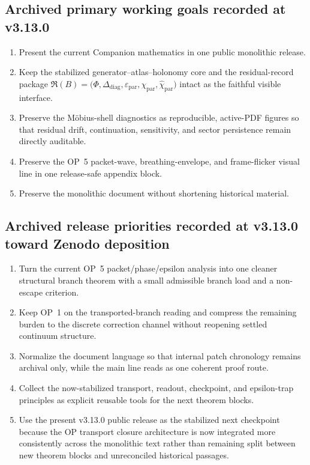 \subsection*{Archived primary working goals recorded at v3.13.0}
\begin{enumerate}[leftmargin=2em]
  \item Present the current Companion mathematics in one public monolithic release.
  \item Keep the stabilized generator--atlas--holonomy core and the residual-record package $\mathfrak R(B)=\bigl(\Phi,\Delta_{\mathrm{diag}},\varepsilon_{\mathrm{par}},\chi_{\mathrm{par}},\widehat\chi_{\mathrm{par}}\bigr)$ intact as the faithful visible interface.
  \item Preserve the M\"obius-shell diagnostics as reproducible, active-PDF figures so that residual drift, continuation, sensitivity, and sector persistence remain directly auditable.
  \item Preserve the OP~5 packet-wave, breathing-envelope, and frame-flicker visual line in one release-safe appendix block.
  \item Preserve the monolithic document without shortening historical material.
\end{enumerate}

\subsection*{Archived release priorities recorded at v3.13.0 toward Zenodo deposition}
\begin{enumerate}[leftmargin=2em]
  \item Turn the current OP~5 packet/phase/epsilon analysis into one cleaner structural branch theorem with a small admissible branch load and a non-escape criterion.
  \item Keep OP~1 on the transported-branch reading and compress the remaining burden to the discrete correction channel without reopening settled continuum structure.
  \item Normalize the document language so that internal patch chronology remains archival only, while the main line reads as one coherent proof route.
  \item Collect the now-stabilized transport, readout, checkpoint, and epsilon-trap principles as explicit reusable tools for the next theorem blocks.
  \item Use the present v3.13.0 public release as the stabilized next checkpoint because the OP transport closure architecture is now integrated more consistently across the monolithic text rather than remaining split between new theorem blocks and unreconciled historical passages.
\end{enumerate}

